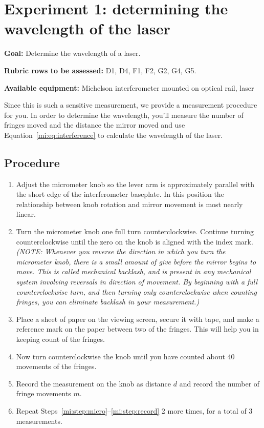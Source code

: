\section{Experiment 1: determining the wavelength of the laser}

\textbf{Goal:} Determine the wavelength of a laser.

\textbf{Rubric rows to be assessed:} D1, D4, F1, F2, G2, G4, G5.

\textbf{Available equipment:} Michelson interferometer mounted on optical rail, laser

Since this is such a sensitive measurement, we provide a measurement procedure for you. In order to determine the wavelength, you'll measure the number of fringes moved and the distance the mirror moved  and use Equation~\ref{mi:eq:interference} to calculate the wavelength of the laser.

\subsection{Procedure}

\begin{enumerate}
	\item\label{mi:step:micro} Adjust the micrometer knob so the lever arm is approximately parallel with the short edge of the interferometer
	baseplate. In this position the relationship between knob rotation and mirror movement is most nearly linear.
	
	\item Turn the micrometer knob one full turn counterclockwise. Continue turning counterclockwise until the zero on the
	knob is aligned with the index mark. \textit{(NOTE: Whenever you reverse the direction in which you turn the micrometer
	knob, there is a small amount of give before the mirror begins to move. This is called mechanical backlash, and is
	present in any mechanical system involving reversals in direction of movement. By beginning with a full
	counterclockwise turn, and then turning only counterclockwise when counting fringes, you can eliminate backlash
	in your measurement.)}

	\item Place a sheet of paper on the viewing screen, secure it with tape, and make a reference mark on the paper between
	two of the fringes. This will help you in keeping count of the fringes.
	
	\item Now turn counterclockwise the knob until you have counted about 40 movements of the fringes.
	
	\item\label{mi:step:record} Record the measurement on the knob as distance $d$ and record the number of fringe movements $m$.
	
	\item Repeat Steps~\ref{mi:step:micro}--\ref{mi:step:record} 2 more times, for a total of 3 measurements.
\end{enumerate}

